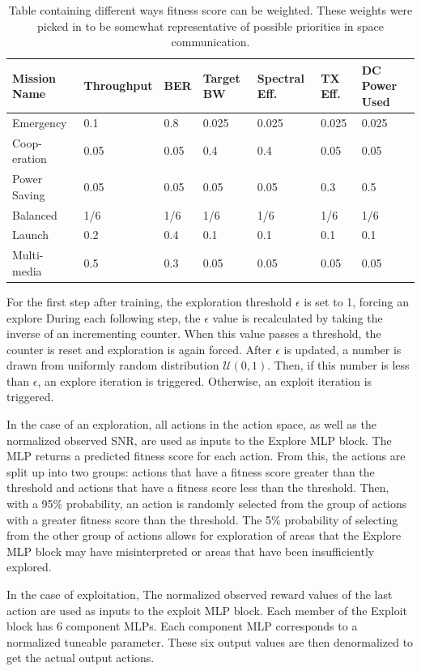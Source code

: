 \begin{table}[ht]
\centering
\begin{tabu} to 1\textwidth{|X[c]|X[c] X[c] X[c] X[c] X[c] X[c]|}
	\hline 
	Mission Name & Throughput&BER&Target BW&Spectral Eff.&TX Eff.&DC Power Used\\
	\hline
	\hline
	Emergency& 0.1 &0.8&0.025&0.025&0.025&0.025 \\
	\hline
	Coop- eration&0.05&0.05&0.4&0.4&0.05&0.05\\
	\hline
	Power Saving&0.05&0.05&0.05&0.05&0.3&0.5\\
	\hline
	Balanced&1/6&1/6&1/6&1/6&1/6&1/6\\
	\hline
	Launch&0.2&0.4&0.1&0.1&0.1&0.1\\
	\hline
	Multi- media&0.5&0.3&0.05&0.05&0.05&0.05\\
	\hline
\end{tabu}
\caption{Table containing different ways fitness score can be weighted. These weights were picked in \cite{paulo_theory_paper} to be somewhat representative of possible priorities in space communication.}
\label{table:fitMissions}
\end{table}
\par For the first step after training, the exploration threshold $\epsilon$ is set to 1, forcing an explore During each following step, the $\epsilon$ value is recalculated by taking the inverse of an incrementing counter. When this value passes a threshold, the counter is reset and exploration is again forced. After $\epsilon$ is updated, a number is drawn from uniformly random distribution $\mathcal{U}(0,1)$. Then, if this number is less than $\epsilon$, an explore iteration is triggered. Otherwise, an exploit iteration is triggered.
\par In the case of an exploration, all actions in the action space, as well as the normalized observed SNR, are used as inputs to the Explore MLP block. The MLP returns a predicted fitness score for each action. From this, the actions are split up into two groups: actions that have a fitness score greater than the threshold and actions that have a fitness score less than the threshold. Then, with a 95\% probability, an action is randomly selected from the group of actions with a greater fitness score than the threshold. The 5\% probability of selecting from the other group of actions allows for exploration of areas that the Explore MLP block may have misinterpreted or areas that have been insufficiently explored.
\par In the case of exploitation, The normalized observed reward values of the last action are used as inputs to the exploit MLP block. Each member of the Exploit block has 6 component MLPs. Each component MLP corresponds to a normalized tuneable parameter. These six output values are then denormalized to get the actual output actions.
